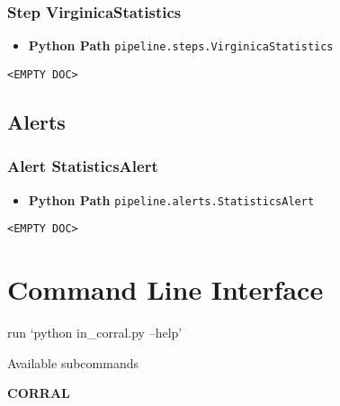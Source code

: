 \subsubsection{\texorpdfstring{Step
\textbf{VirginicaStatistics}}{Step VirginicaStatistics}}\label{step-virginicastatistics}

\begin{itemize}
\tightlist
\item
  \textbf{Python Path} \texttt{pipeline.steps.VirginicaStatistics}
\end{itemize}

\texttt{\textless{}EMPTY\ DOC\textgreater{}}

\subsection{Alerts}\label{alerts}

\subsubsection{\texorpdfstring{Alert
\textbf{StatisticsAlert}}{Alert StatisticsAlert}}\label{alert-statisticsalert}

\begin{itemize}
\tightlist
\item
  \textbf{Python Path} \texttt{pipeline.alerts.StatisticsAlert}
\end{itemize}

\texttt{\textless{}EMPTY\ DOC\textgreater{}}

\section{Command Line Interface}\label{command-line-interface}

run `python in\_corral.py --help'

Available subcommands

\textbf{CORRAL}

